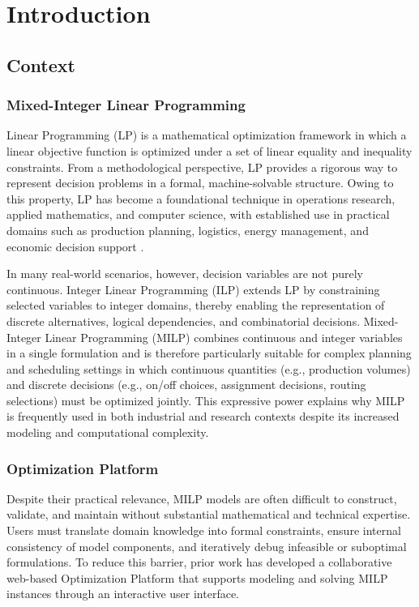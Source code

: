 \chapter{Introduction}
\section{Context}
\subsection{Mixed-Integer Linear Programming}
Linear Programming (LP) \cite{wiki:Linear_programming} is a mathematical optimization framework in which a linear objective function is optimized under a set of linear equality and inequality constraints. From a methodological perspective, LP provides a rigorous way to represent decision problems in a formal, machine-solvable structure. Owing to this property, LP has become a foundational technique in operations research, applied mathematics, and computer science, with established use in practical domains such as production planning, logistics, energy management, and economic decision support \cite{kunwar2022introduction}.

In many real-world scenarios, however, decision variables are not purely continuous. Integer Linear Programming (ILP) \cite{wiki:Integer_programming} extends LP by constraining selected variables to integer domains, thereby enabling the representation of discrete alternatives, logical dependencies, and combinatorial decisions. Mixed-Integer Linear Programming (MILP) combines continuous and integer variables in a single formulation and is therefore particularly suitable for complex planning and scheduling settings in which continuous quantities (e.g., production volumes) and discrete decisions (e.g., on/off choices, assignment decisions, routing selections) must be optimized jointly. This expressive power explains why MILP is frequently used in both industrial and research contexts despite its increased modeling and computational complexity.

\subsection{Optimization Platform}
Despite their practical relevance, MILP models are often difficult to construct, validate, and maintain without substantial mathematical and technical expertise. Users must translate domain knowledge into formal constraints, ensure internal consistency of model components, and iteratively debug infeasible or suboptimal formulations. To reduce this barrier, prior work has developed a collaborative web-based Optimization Platform \cite{MarkoThesisMsc, DeniThesisMsc, MarkoThesisBsc, MaksimThesisMsc} that supports modeling and solving MILP instances through an interactive user interface.

